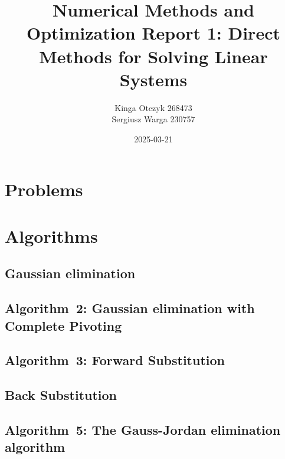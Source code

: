 \documentclass[a4paper]{article}
\title{Numerical Methods and Optimization Report 1:
  Direct Methods for Solving Linear Systems}
\author{Kinga Otczyk 268473\\Sergiusz Warga 230757}
\date{2025-03-21}
\begin{document}
\maketitle
\tableofcontents
\pagebreak

\section{Problems}









\clearpage

\section{Algorithms}
\subsection{Gaussian elimination}%
\label{algorithm:gaussian_elimination}

\subsection{Algorithm~2: Gaussian  elimination  with  Complete  Pivoting}%
\label{algorithm:2}

\subsection{Algorithm~3: Forward Substitution}%
\label{algorithm:3}

\subsection{Back Substitution}%
\label{algorithm:back_substitution}

\subsection{Algorithm~5: The Gauss-Jordan elimination algorithm}%
\label{algorithm:5}

\end{document}
